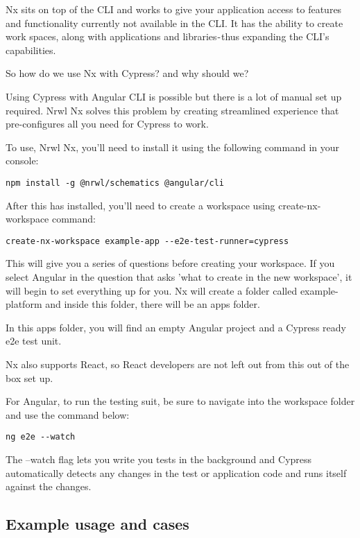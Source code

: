 Nx sits on top of the CLI and works to give your application access to features
and functionality currently not available in the CLI. It has the ability to
create work spaces, along with applications and libraries - thus expanding the
CLI's capabilities.

So how do we use Nx with Cypress? and why should we?

Using Cypress with Angular CLI is possible but there is a lot of manual set up
required. Nrwl Nx solves this problem by creating streamlined experience that
pre-configures all you need for Cypress to work.

To use, Nrwl Nx, you'll need to install it using the following command in your
console:

\begin{verbatim}
npm install -g @nrwl/schematics @angular/cli
\end{verbatim}

After this has installed, you'll need to create a workspace using
create-nx-workspace command:

\begin{verbatim}
create-nx-workspace example-app --e2e-test-runner=cypress
\end{verbatim}

This will give you a series of questions before creating your workspace. If you
select Angular in the question that asks 'what to create in the new workspace',
it will begin to set everything up for you. Nx will create a folder called
example-platform and inside this folder, there will be an apps folder.

In this apps folder, you will find an empty Angular project and a Cypress ready
e2e test unit.

Nx also supports React, so React developers are not left out from this out of
the box set up.

For Angular, to run the testing suit, be sure to navigate into the workspace
folder and use the command below:

\begin{verbatim}
ng e2e --watch
\end{verbatim}

The --watch flag lets you write you tests in the background and Cypress
automatically detects any changes in the test or application code and runs
itself against the changes.

\subsection{ Example usage and cases }

